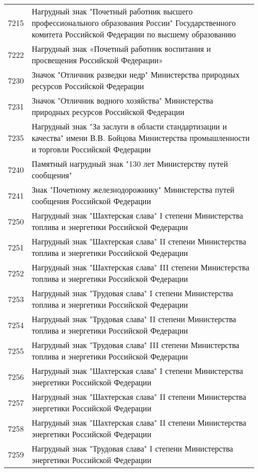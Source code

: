 \documentclass[10pt, a4paper, titlepage]{article}
\begin{document}
\begin{center}
\begin{longtable}{rp{}}
        7215 & Нагрудный знак "Почетный работник высшего профессионального образования России" Государственного комитета Российской Федерации по высшему образованию \\
        7222 & Нагрудный знак «Почетный работник воспитания и просвещения Российской Федерации» \\
        7230 & Значок "Отличник разведки недр" Министерства природных ресурсов Российской Федерации \\
        7231 & Значок "Отличник водного хозяйства" Министерства природных ресурсов Российской Федерации \\
        7235 & Нагрудный знак "За заслуги в области стандартизации и качества" имени В.В. Бойцова Министерства промышленности и торговли Российской Федерации \\
        7240 & Памятный нагрудный знак "130 лет Министерству путей сообщения" \\
        7241 & Знак "Почетному железнодорожнику" Министерства путей сообщения Российской Федерации \\
        7250 & Нагрудный знак "Шахтерская слава" I степени Министерства топлива и энергетики Российской Федерации \\
        7251 & Нагрудный знак "Шахтерская слава" II степени Министерства топлива и энергетики Российской Федерации \\
        7252 & Нагрудный знак "Шахтерская слава" III степени Министерства топлива и энергетики Российской Федерации \\
        7253 & Нагрудный знак "Трудовая слава" I степени Министерства топлива и энергетики Российской Федерации \\
        7254 & Нагрудный знак "Трудовая слава" II степени Министерства топлива и энергетики Российской Федерации \\
        7255 & Нагрудный знак "Трудовая слава" III степени Министерства топлива и энергетики Российской Федерации \\
        7256 & Нагрудный знак "Шахтерская слава" I степени Министерства энергетики Российской Федерации \\
        7257 & Нагрудный знак "Шахтерская слава" II степени Министерства энергетики Российской Федерации \\
        7258 & Нагрудный знак "Шахтерская слава" II степени Министерства энергетики Российской Федерации \\
        7259 & Нагрудный знак "Трудовая слава" I степени Министерства энергетики Российской Федерации \\

\end{longtable}
\end{center}
\end{document}
